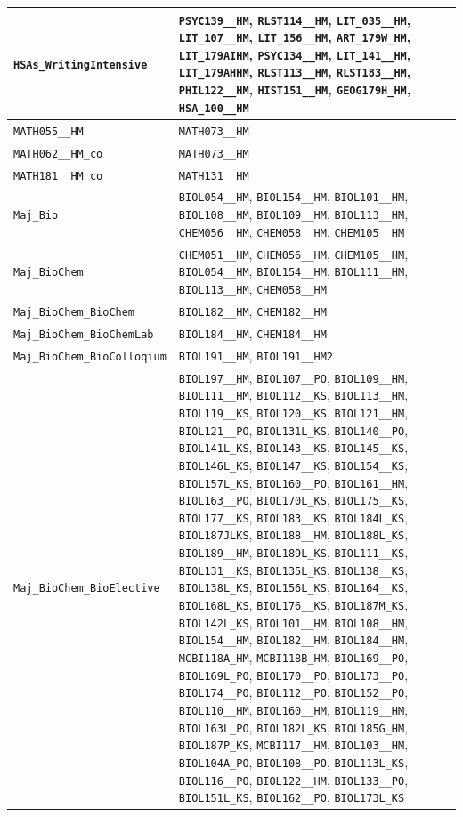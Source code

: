 \begin{longtable}{|p{4.4in}|p{4.4in}|}
    \verb|HSAs_WritingIntensive| & \verb|PSYC139__HM|, \verb|RLST114__HM|, \verb|LIT_035__HM|, \verb|LIT_107__HM|, \verb|LIT_156__HM|, \verb|ART_179W_HM|, \verb|LIT_179AIHM|, \verb|PSYC134__HM|, \verb|LIT_141__HM|, \verb|LIT_179AHHM|, \verb|RLST113__HM|, \verb|RLST183__HM|, \verb|PHIL122__HM|, \verb|HIST151__HM|, \verb|GEOG179H_HM|, \verb|HSA_100__HM|\\\hline
    \verb|MATH055__HM| & \verb|MATH073__HM|\\\hline
    \verb|MATH062__HM_co| & \verb|MATH073__HM|\\\hline
    \verb|MATH181__HM_co| & \verb|MATH131__HM|\\\hline
    \verb|Maj_Bio| & \verb|BIOL054__HM|, \verb|BIOL154__HM|, \verb|BIOL101__HM|, \verb|BIOL108__HM|, \verb|BIOL109__HM|, \verb|BIOL113__HM|, \verb|CHEM056__HM|, \verb|CHEM058__HM|, \verb|CHEM105__HM|\\\hline
    \verb|Maj_BioChem| & \verb|CHEM051__HM|, \verb|CHEM056__HM|, \verb|CHEM105__HM|, \verb|BIOL054__HM|, \verb|BIOL154__HM|, \verb|BIOL111__HM|, \verb|BIOL113__HM|, \verb|CHEM058__HM|\\\hline
    \verb|Maj_BioChem_BioChem| & \verb|BIOL182__HM|, \verb|CHEM182__HM|\\\hline
    \verb|Maj_BioChem_BioChemLab| & \verb|BIOL184__HM|, \verb|CHEM184__HM|\\\hline
    \verb|Maj_BioChem_BioColloqium| & \verb|BIOL191__HM|, \verb|BIOL191__HM2|\\\hline
    \verb|Maj_BioChem_BioElective| & \verb|BIOL197__HM|, \verb|BIOL107__PO|, \verb|BIOL109__HM|, \verb|BIOL111__HM|, \verb|BIOL112__KS|, \verb|BIOL113__HM|, \verb|BIOL119__KS|, \verb|BIOL120__KS|, \verb|BIOL121__HM|, \verb|BIOL121__PO|, \verb|BIOL131L_KS|, \verb|BIOL140__PO|, \verb|BIOL141L_KS|, \verb|BIOL143__KS|, \verb|BIOL145__KS|, \verb|BIOL146L_KS|, \verb|BIOL147__KS|, \verb|BIOL154__KS|, \verb|BIOL157L_KS|, \verb|BIOL160__PO|, \verb|BIOL161__HM|, \verb|BIOL163__PO|, \verb|BIOL170L_KS|, \verb|BIOL175__KS|, \verb|BIOL177__KS|, \verb|BIOL183__KS|, \verb|BIOL184L_KS|, \verb|BIOL187JLKS|, \verb|BIOL188__HM|, \verb|BIOL188L_KS|, \verb|BIOL189__HM|, \verb|BIOL189L_KS|, \verb|BIOL111__KS|, \verb|BIOL131__KS|, \verb|BIOL135L_KS|, \verb|BIOL138__KS|, \verb|BIOL138L_KS|, \verb|BIOL156L_KS|, \verb|BIOL164__KS|, \verb|BIOL168L_KS|, \verb|BIOL176__KS|, \verb|BIOL187M_KS|, \verb|BIOL142L_KS|, \verb|BIOL101__HM|, \verb|BIOL108__HM|, \verb|BIOL154__HM|, \verb|BIOL182__HM|, \verb|BIOL184__HM|, \verb|MCBI118A_HM|, \verb|MCBI118B_HM|, \verb|BIOL169__PO|, \verb|BIOL169L_PO|, \verb|BIOL170__PO|, \verb|BIOL173__PO|, \verb|BIOL174__PO|, \verb|BIOL112__PO|, \verb|BIOL152__PO|, \verb|BIOL110__HM|, \verb|BIOL160__HM|, \verb|BIOL119__HM|, \verb|BIOL163L_PO|, \verb|BIOL182L_KS|, \verb|BIOL185G_HM|, \verb|BIOL187P_KS|, \verb|MCBI117__HM|, \verb|BIOL103__HM|, \verb|BIOL104A_PO|, \verb|BIOL108__PO|, \verb|BIOL113L_KS|, \verb|BIOL116__PO|, \verb|BIOL122__HM|, \verb|BIOL133__PO|, \verb|BIOL151L_KS|, \verb|BIOL162__PO|, \verb|BIOL173L_KS|\\\hline

\end{longtable}
